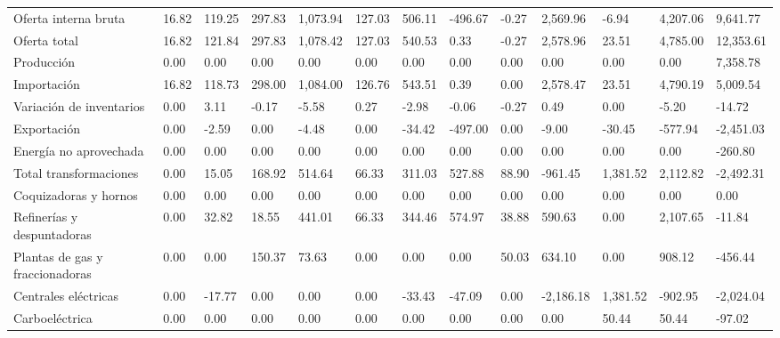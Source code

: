\documentclass{sener2025}
\begin{document}
\begin{tabladoradoLargo}
\begin{xltabular}{\textwidth}{QZZZZZZZZZZZZ}
    Oferta interna bruta & 16.82 & 119.25 & 297.83 & 1,073.94 & 127.03 & 506.11 & -496.67 & -0.27 & 2,569.96 & -6.94 & 4,207.06 & 9,641.77 \\
    \hspace{1.35em} Oferta total & 16.82 & 121.84 & 297.83 & 1,078.42 & 127.03 & 540.53 & 0.33 & -0.27 & 2,578.96 & 23.51 & 4,785.00 & 12,353.61 \\
    \hspace{2.7em} Producción & 0.00 & 0.00 & 0.00 & 0.00 & 0.00 & 0.00 & 0.00 & 0.00 & 0.00 & 0.00 & 0.00 & 7,358.78 \\
    \hspace{2.7em} Importación & 16.82 & 118.73 & 298.00 & 1,084.00 & 126.76 & 543.51 & 0.39 & 0.00 & 2,578.47 & 23.51 & 4,790.19 & 5,009.54 \\
    \hspace{2.7em} Variación de inventarios & 0.00 & 3.11 & -0.17 & -5.58 & 0.27 & -2.98 & -0.06 & -0.27 & 0.49 & 0.00 & -5.20 & -14.72 \\
    \hspace{1.35em} Exportación & 0.00 & -2.59 & 0.00 & -4.48 & 0.00 & -34.42 & -497.00 & 0.00 & -9.00 & -30.45 & -577.94 & -2,451.03 \\
    \hspace{1.35em} Energía no aprovechada & 0.00 & 0.00 & 0.00 & 0.00 & 0.00 & 0.00 & 0.00 & 0.00 & 0.00 & 0.00 & 0.00 & -260.80 \\
    Total transformaciones & 0.00 & 15.05 & 168.92 & 514.64 & 66.33 & 311.03 & 527.88 & 88.90 & -961.45 & 1,381.52 & 2,112.82 & -2,492.31 \\
    \hspace{1.35em} Coquizadoras y hornos & 0.00 & 0.00 & 0.00 & 0.00 & 0.00 & 0.00 & 0.00 & 0.00 & 0.00 & 0.00 & 0.00 & 0.00 \\
    \hspace{1.35em} Refinerías y despuntadoras & 0.00 & 32.82 & 18.55 & 441.01 & 66.33 & 344.46 & 574.97 & 38.88 & 590.63 & 0.00 & 2,107.65 & -11.84 \\
    \hspace{1.35em} Plantas de gas y fraccionadoras & 0.00 & 0.00 & 150.37 & 73.63 & 0.00 & 0.00 & 0.00 & 50.03 & 634.10 & 0.00 & 908.12 & -456.44 \\
    \hspace{1.35em} Centrales eléctricas & 0.00 & -17.77 & 0.00 & 0.00 & 0.00 & -33.43 & -47.09 & 0.00 & -2,186.18 & 1,381.52 & -902.95 & -2,024.04 \\
    \hspace{2.7em} Carboeléctrica & 0.00 & 0.00 & 0.00 & 0.00 & 0.00 & 0.00 & 0.00 & 0.00 & 0.00 & 50.44 & 50.44 & -97.02 \\

\end{xltabular}
\end{tabladoradoLargo}
\end{document}
